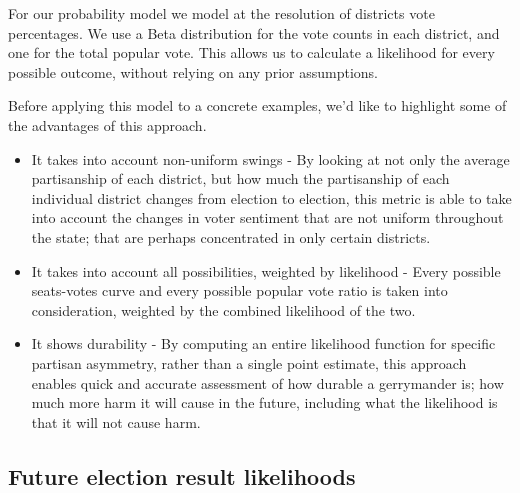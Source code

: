 \documentclass[preprint,12pt]{article}
\begin{document}
For our probability model we model at the resolution of districts vote percentages.
We use a Beta distribution for the vote counts in each district, and one for the total popular vote.
This allows us to calculate a likelihood for every possible outcome, without relying on any prior assumptions.

Before applying this model to a concrete examples, we'd like to highlight some of the advantages of this approach.

\begin{itemize}

\item It takes into account non-uniform swings - By looking at not only the average partisanship of each district, but how much the partisanship of each individual district changes from election to election, this metric is able to take into account the changes in voter sentiment that are not uniform throughout the state; that are perhaps concentrated in only certain districts.

\item It takes into account all possibilities, weighted by likelihood - Every possible seats-votes curve and every possible popular vote ratio is taken into consideration, weighted by the combined likelihood of the two.

\item It shows durability - By computing an entire likelihood function for specific partisan asymmetry, rather than a single point estimate, this approach enables quick and accurate assessment of how durable a gerrymander is; how much more harm it will cause in the future, including what the likelihood is that it will not cause harm.

\end{itemize}

\subsection{Future election result likelihoods}
\end{document}
